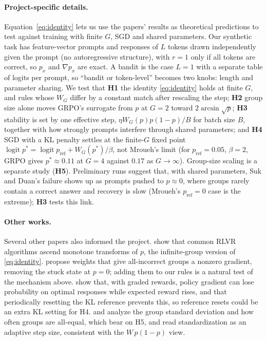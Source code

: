 \documentclass{article}
\theoremstyle{definition}
\newcommand{\1}{\mathbf{1}}
\newcommand{\pref}{p_{\mathrm{ref}}}
\DeclareMathOperator{\logit}{logit}
\begin{document}
\paragraph{Project-specific details.}
Equation~\eqref{eq:identity} lets us use the papers' results as
theoretical predictions to test against training with finite $G$, SGD and shared parameters. Our synthetic task
has feature-vector prompts and responses of $L$ tokens drawn
independently given the prompt (no autoregressive structure), with
$r=1$ only if all tokens are correct, so $p_x$ and $\nabla p_x$ are
exact. A bandit is the case $L=1$ with a separate table of logits per
prompt, so ``bandit or token-level'' becomes two knobs: length and
parameter sharing. We test that \textbf{H1} the identity \eqref{eq:identity} holds at finite
$G$, and rules whose $W_G$ differ by a constant match after rescaling
the step; \textbf{H2} group size alone moves GRPO's surrogate from $p$ at $G=2$
toward $2\arcsin\sqrt p$; \textbf{H3} stability is set by one effective step,
$\eta W_G(p)p(1-p)/B$ for batch size $B$, together with how strongly
prompts interfere through shared parameters; and \textbf{H4} SGD with a KL
penalty settles at the finite-$G$ fixed point
$\logit p^\ast=\logit\pref+W_G(p^\ast)/\beta$, not Mroueh's limit (for
$\pref=0.05$, $\beta=2$, GRPO gives $p^\ast\approx0.11$ at $G=4$ against
$0.17$ as $G\to\infty$). Group-size scaling is a separate study (\textbf{H5}).
Preliminary runs suggest that, with shared parameters, Suk and Duan's
failure shows up as prompts pushed to $p\approx0$, where groups rarely
contain a correct answer and recovery is slow (Mroueh's $\pref=0$ case is
the extreme); \textbf{H3} tests this link.

\paragraph{Other works.}
Several other papers also informed the project. \citet{davis2025objective}
show that common RLVR algorithms ascend monotone transforms of $p$, the
infinite-group version of \eqref{eq:identity}. \citet{heckel2026asymmetric}
propose weights that give all-incorrect groups a nonzero gradient,
removing the stuck state at $p=0$; adding them to our rules is a natural
test of the mechanism above. \citet{huang2026coverage} show that, with
graded rewards, policy gradient can lose probability on optimal
responses while expected reward rises, and that periodically resetting
the KL reference prevents this, so reference resets could be an
extra KL setting for H4. \citet{bay2026grpostd} and
\citet{nie2026starvation} analyze the group standard deviation and how
often groups are all-equal, which bear on H5, and
\citet{ge2026normalization} read standardization as an adaptive step
size, consistent with the $W\,p(1-p)$ view.




\end{document}
